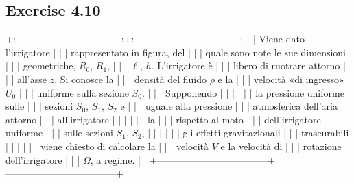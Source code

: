 \documentclass[letterpaper,10pt,italian]{jupyterBook}
\begin{document}
\sphinxstepscope


\subsection{Exercise 4.10}
\label{\detokenize{polimi/fluidmechanics-ita/template/capitoli/04_bilanci/04ma01in:exercise-4-10}}\label{\detokenize{polimi/fluidmechanics-ita/template/capitoli/04_bilanci/04ma01in:fluid-mechanics-balances-ex-10}}\label{\detokenize{polimi/fluidmechanics-ita/template/capitoli/04_bilanci/04ma01in::doc}}
\sphinxAtStartPar
+:———————————:+:———————————:+
| Viene dato l’irrigatore           |                                   |
| rappresentato in figura, del      |                                   |
| quale sono note le sue dimensioni |                                   |
| geometriche, \(R_0\), \(R_1\),        |                                   |
| \(\ell\), \(h\). L’irrigatore è       |                                   |
| libero di ruotrare attorno        |                                   |
| all’asse \(z\). Si conosce la       |                                   |
| densità del fluido \(\rho\) e la    |                                   |
| velocità «di ingresso» \(U_0\)      |                                   |
| uniforme sulla sezione \(S_0\).     |                                   |
| Supponendo                        |                                   |
|                                   |                                   |
| \sphinxhyphen{}   la pressione uniforme sulle   |                                   |
|     sezioni \(S_0\), \(S_1\), \(S_2\) e |                                   |
|     uguale alla pressione         |                                   |
|     atmosferica dell’aria attorno |                                   |
|     all’irrigatore                |                                   |
|                                   |                                   |
| \sphinxhyphen{}   la       |                                   |
|     rispetto al moto              |                                   |
|     dell’irrigatore uniforme      |                                   |
|     sulle sezioni \(S_1\), \(S_2\),   |                                   |
|                                   |                                   |
| \sphinxhyphen{}   gli effetti gravitazionali    |                                   |
|     trascurabili                  |                                   |
|                                   |                                   |
| viene chiesto di calcolare la     |                                   |
| velocità \(V\) e la velocità di     |                                   |
| rotazione dell’irrigatore         |                                   |
| \(\Omega\), a regime.               |                                   |
+———————————–+———————————–+
\end{document}
